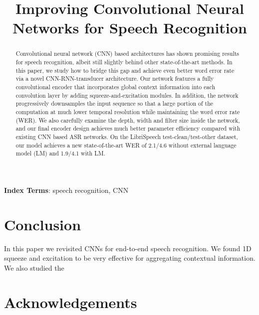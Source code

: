 \documentclass[a4paper]{article}
\title{Improving Convolutional Neural Networks for Speech Recognition}
\begin{document}
\maketitle
% 
\begin{abstract}
Convolutional neural network (CNN) based architectures has shown promising results for speech recognition, albeit still slightly behind other state-of-the-art methods. In this paper, we study how to bridge this gap and achieve even better word error rate via a novel CNN-RNN-transducer architecture. Our network features a fully convolutional encoder that incorporates global context information into each convolution layer by adding squeeze-and-excitation modules. In addition, the network progressively downsamples the input sequence so that a large portion of the computation at much lower temporal resolution while maintaining the word error rate (WER). We also carefully examine the depth, width and filter size inside the network, and our final encoder design achieves much better parameter efficiency compared with existing CNN based ASR networks. On the LibriSpeech test-clean/test-other dataset, our model achieves a new state-of-the-art WER of 2.1/4.6 without external language model (LM) and 1.9/4.1 with LM. 

\end{abstract}
\noindent\textbf{Index Terms}: speech recognition, CNN





\section{Conclusion}
In this paper we revisited CNNs for end-to-end speech recognition. We found 1D squeeze and excitation to be very effective for aggregating contextual information. We also studied the   

\section{Acknowledgements}




\end{document}
